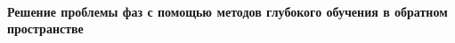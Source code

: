 \documentclass[a4paper,12pt]{article}
\begin{document}
\renewcommand{\figurename}{Рисунок}
\setcounter{page}{1}
\renewcommand{\contentsname}{Оглавление}

\begin{center}
\\
\begin{Large}
\textbf{Решение проблемы фаз с помощью методов глубокого обучения в обратном пространстве}\\
\end{Large}
\\
\\
\end{center}
\end{document}
